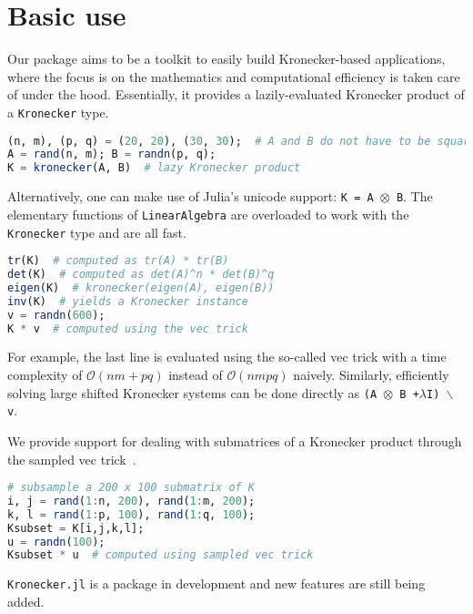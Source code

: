 \documentclass{juliacon}
\begin{document}
\section{Basic use}

Our package aims to be a toolkit to easily build Kronecker-based applications, where the focus is on the mathematics and computational efficiency is taken care of under the hood. Essentially, it provides a lazily-evaluated Kronecker product of a \texttt{Kronecker} type.

\begin{lstlisting}[language = Julia]
(n, m), (p, q) = (20, 20), (30, 30);  # A and B do not have to be square
A = rand(n, m); B = randn(p, q);
K = kronecker(A, B)  # lazy Kronecker product
\end{lstlisting}

Alternatively, one can make use of Julia's unicode support: \texttt{K = A $\otimes$ B}.
The elementary functions of \texttt{LinearAlgebra} are overloaded to work with the \texttt{Kronecker} type and are all fast.

\begin{lstlisting}[language = Julia]
tr(K)  # computed as tr(A) * tr(B)
det(K)  # computed as det(A)^n * det(B)^q
eigen(K)  # kronecker(eigen(A), eigen(B))
inv(K)  # yields a Kronecker instance
v = randn(600);
K * v  # computed using the vec trick
\end{lstlisting}

For example, the last line is evaluated using the so-called vec trick with a time complexity of $\mathcal{O}(nm+pq)$ instead of $\mathcal{O}(nmpq)$ naively.
Similarly, efficiently solving large shifted Kronecker systems can be done directly as \texttt{(A $\otimes$ B +$\lambda$I) $\backslash$ v}.

We provide support for dealing with submatrices of a Kronecker product through the sampled vec trick~\cite{Airola2017genvectric}.

\begin{lstlisting}[language = Julia]
# subsample a 200 x 100 submatrix of K
i, j = rand(1:n, 200), rand(1:m, 200);
k, l = rand(1:p, 100), rand(1:q, 100);
Ksubset = K[i,j,k,l];
u = randn(100);
Ksubset * u  # computed using sampled vec trick
\end{lstlisting}

\texttt{Kronecker.jl} is a package in development and new features are still being added.
\end{document}
